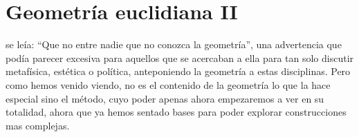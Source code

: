 \chapter{Geometría euclidiana II} %
\label{cha:geometria_euclidiana_ii}

\noindent {} se leía: ``Que no
entre nadie que no conozca la geometría'', una advertencia que podía parecer
excesiva para aquellos que se acercaban a ella para tan solo discutir
metafísica, estética o política, anteponiendo la geometría a estas disciplinas.
Pero como hemos venido viendo, no es el contenido de la geometría lo que la hace
especial sino el método, cuyo poder apenas ahora empezaremos a ver en su
totalidad, ahora que ya hemos sentado bases para poder explorar construcciones
mas complejas. 



